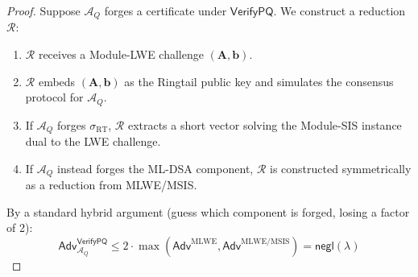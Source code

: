 \begin{proof}
Suppose $\mathcal{A}_Q$ forges a certificate under
$\mathsf{VerifyPQ}$.  We construct a reduction $\mathcal{R}$:
\begin{enumerate}[nosep]
  \item $\mathcal{R}$ receives a Module-LWE challenge
    $(\mathbf{A}, \mathbf{b})$.
  \item $\mathcal{R}$ embeds $(\mathbf{A}, \mathbf{b})$ as the
    Ringtail public key and simulates the consensus protocol for
    $\mathcal{A}_Q$.
  \item If $\mathcal{A}_Q$ forges $\sigma_{\mathrm{RT}}$,
    $\mathcal{R}$ extracts a short vector solving the Module-SIS
    instance dual to the LWE challenge.
  \item If $\mathcal{A}_Q$ instead forges the ML-DSA component,
    $\mathcal{R}$ is constructed symmetrically as a reduction from
    MLWE/MSIS.
\end{enumerate}
By a standard hybrid argument (guess which component is forged, losing
a factor of 2):
\[
  \mathsf{Adv}^{\mathsf{VerifyPQ}}_{\mathcal{A}_Q} \leq
  2 \cdot \max(\mathsf{Adv}^{\text{MLWE}},
  \mathsf{Adv}^{\text{MLWE/MSIS}}) = \mathsf{negl}(\lambda)
\]
\end{proof}


